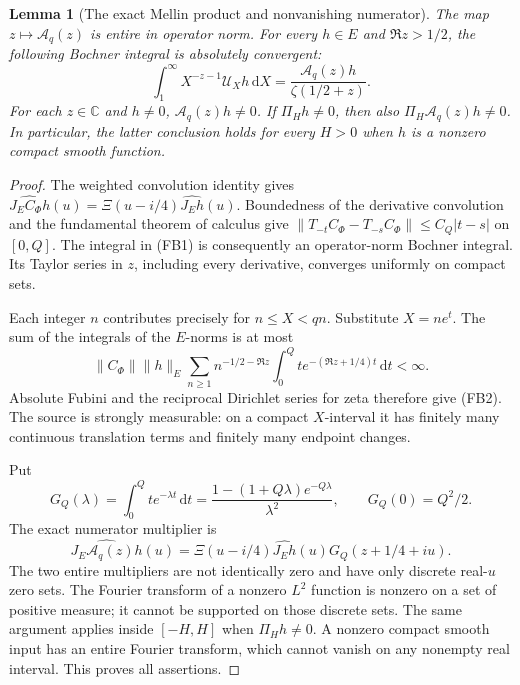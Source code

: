 \documentclass[11pt]{article}
\newtheorem{lemma}[theorem]{Lemma}
\theoremstyle{remark}\newtheorem{remark}[theorem]{Remark}
\newcommand{\C}{\mathbb C}
\newcommand{\dd}{\,\mathrm d}
\begin{document}
\begin{lemma}[The exact Mellin product and nonvanishing numerator]
\label{lem:log-source-mellin}
The map \(z\mapsto\mathcal A_q(z)\) is entire in operator norm.
For every \(h\in E\) and \(\Re z>1/2\), the following Bochner
integral is absolutely convergent:
\[
 \int_1^\infty X^{-z-1}\mathcal U_Xh\dd X
       =\frac{\mathcal A_q(z)h}{\zeta(1/2+z)} .
 \tag{FB2}\label{eq:log-source-mellin}
\]
For each \(z\in\C\) and \(h\ne0\), \(\mathcal A_q(z)h\ne0\).
If \(\Pi_Hh\ne0\), then also \(\Pi_H\mathcal A_q(z)h\ne0\).
In particular, the latter conclusion holds for every \(H>0\)
when \(h\) is a nonzero compact smooth function.
\end{lemma}
\begin{proof}
The weighted convolution identity gives
\(\widehat{J_EC_\Phi h}(u)=\Xi(u-i/4)\widehat{J_Eh}(u)\).
Boundedness of the derivative convolution and the fundamental
theorem of calculus give
\(\|T_{-t}C_\Phi-T_{-s}C_\Phi\|\le C_Q|t-s|\) on \([0,Q]\).
The integral in (FB1) is consequently an operator-norm Bochner
integral. Its Taylor series in \(z\), including every derivative,
converges uniformly on compact sets.

Each integer \(n\) contributes precisely for \(n\le X<qn\).
Substitute \(X=ne^t\). The sum of the integrals of the \(E\)-norms
is at most
\[
 \|C_\Phi\|\|h\|_E
 \sum_{n\ge1}n^{-1/2-\Re z}
       \int_0^Q t e^{-(\Re z+1/4)t}\dd t<\infty .
\]
Absolute Fubini and the reciprocal Dirichlet series for zeta
therefore give (FB2). The source is strongly measurable: on a
compact \(X\)-interval it has finitely many continuous translation
terms and finitely many endpoint changes.

Put
\[
 G_Q(\lambda)=\int_0^Q t e^{-\lambda t}\dd t
   =\frac{1-(1+Q\lambda)e^{-Q\lambda}}{\lambda^2},
 \qquad G_Q(0)=Q^2/2 .
\]
The exact numerator multiplier is
\[
 \widehat{J_E\mathcal A_q(z)h}(u)
   =\Xi(u-i/4)\widehat{J_Eh}(u)G_Q(z+1/4+iu).
 \tag{FB3}\label{eq:fixed-band-numerator}
\]
The two entire multipliers are not identically zero and have
only discrete real-\(u\) zero sets. The Fourier transform of a
nonzero \(L^2\) function is nonzero on a set of positive measure;
it cannot be supported on those discrete sets. The same argument
applies inside \([-H,H]\) when \(\Pi_Hh\ne0\). A nonzero compact
smooth input has an entire Fourier transform, which cannot vanish
on any nonempty real interval. This proves all assertions.
\end{proof}
\end{document}
